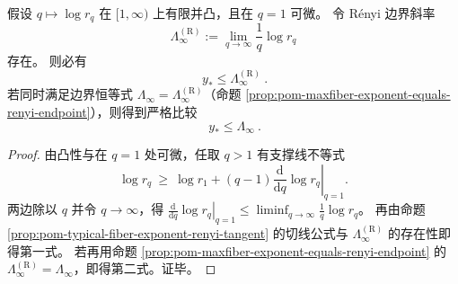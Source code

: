 \begin{proposition}[凸锥单调性：\texorpdfstring{$q\mapsto\log r_q$}{q->log rq} 的凸性强制 \texorpdfstring{$y_\ast\le\Lambda_\infty$}{y*<=Lambda_infty}]\label{prop:pom-convexity-forces-typical-le-worst}
假设 \(q\mapsto \log r_q\) 在 \([1,\infty)\) 上有限并凸，且在 \(q=1\) 可微。
令 Rényi 边界斜率
\[
\Lambda_\infty^{(\mathrm R)}:=\lim_{q\to\infty}\frac{1}{q}\log r_q
\]
存在。
则必有
\[
\boxed{\ y_\ast\le \Lambda_\infty^{(\mathrm R)}\ }.
\]
若同时满足边界恒等式 \(\Lambda_\infty=\Lambda_\infty^{(\mathrm R)}\)（命题 \ref{prop:pom-maxfiber-exponent-equals-renyi-endpoint}），则得到严格比较
\[
\boxed{\ y_\ast\le \Lambda_\infty\ }.
\]
\end{proposition}
\begin{proof}
由凸性与在 \(q=1\) 处可微，任取 \(q>1\) 有支撑线不等式
\[
\log r_q\ \ge\ \log r_1+(q-1)\left.\frac{\mathrm d}{\mathrm dq}\log r_q\right|_{q=1}.
\]
两边除以 \(q\) 并令 \(q\to\infty\)，得
\(
\left.\frac{\mathrm d}{\mathrm dq}\log r_q\right|_{q=1}\le \liminf_{q\to\infty}\frac{1}{q}\log r_q
\)。
再由命题 \ref{prop:pom-typical-fiber-exponent-renyi-tangent} 的切线公式与 \(\Lambda_\infty^{(\mathrm R)}\) 的存在性即得第一式。
若再用命题 \ref{prop:pom-maxfiber-exponent-equals-renyi-endpoint} 的 \(\Lambda_\infty^{(\mathrm R)}=\Lambda_\infty\)，即得第二式。证毕。
\end{proof}

